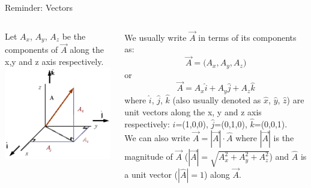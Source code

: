 {\begin{frame}[t]{Reminder: Vectors}
\begin{columns}[t]
  \begin{column}{0.45\textwidth}
   \begin{center}
     {\scriptsize
       Let $A_x$, $A_y$, $A_z$ be the components of $\vec{A}$
       along the x,y and z axis respectively.\\
     }
     \vspace{0.3cm}
     \includegraphics[width=0.98\textwidth]{./images/schematics/vector_in_3D_right_handed_coordinate_system_1.png}\\
     \vspace{0.3cm}
   \end{center}
  \end{column}
  \begin{column}{0.55\textwidth}
  {\scriptsize
     We usually write $\vec{A}$ in terms of its components as:
     \begin{equation*}
       \vec{A} = \Big( A_x, A_y, A_z \Big)
     \end{equation*}
     or
     \begin{equation*}
       \vec{A} = A_x \hat{i} + A_y \hat{j} + A_z \hat{k}
     \end{equation*}
     where $\hat{i}$, $\hat{j}$, $\hat{k}$
     (also usually denoted as  $\hat{x}$, $\hat{y}$, $\hat{z}$)
     are unit vectors along the x, y and z axis respectively:
     $\hat{i}$=(1,0,0), $\hat{j}$=(0,1,0), $\hat{k}$=(0,0,1).\\
     \vspace{0.3cm}
     We can also write $\vec{A} = |\vec{A}| \cdot \hat{A}$
     where $|\vec{A}|$ is the magnitude of $\vec{A}$ ($|\vec{A}|=\sqrt{A_x^2 + A_y^2 + A_z^2}$)
     and $\hat{A}$ is a unit vector ($|\hat{A}|=1$) along $\vec{A}$.\\
  }
  \end{column}
\end{columns}


\end{frame}}
